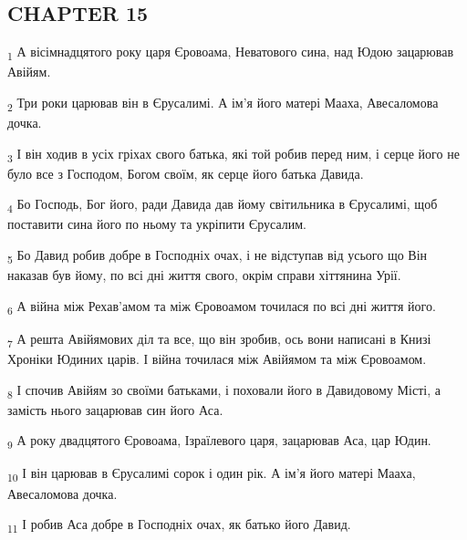 \subsection{CHAPTER 15}
\begin{tcolorbox}
\textsubscript{1} А вісімнадцятого року царя Єровоама, Неватового сина, над Юдою зацарював Авійям.
\end{tcolorbox}
\begin{tcolorbox}
\textsubscript{2} Три роки царював він в Єрусалимі. А ім'я його матері Мааха, Авесаломова дочка.
\end{tcolorbox}
\begin{tcolorbox}
\textsubscript{3} І він ходив в усіх гріхах свого батька, які той робив перед ним, і серце його не було все з Господом, Богом своїм, як серце його батька Давида.
\end{tcolorbox}
\begin{tcolorbox}
\textsubscript{4} Бо Господь, Бог його, ради Давида дав йому світильника в Єрусалимі, щоб поставити сина його по ньому та укріпити Єрусалим.
\end{tcolorbox}
\begin{tcolorbox}
\textsubscript{5} Бо Давид робив добре в Господніх очах, і не відступав від усього що Він наказав був йому, по всі дні життя свого, окрім справи хіттянина Урії.
\end{tcolorbox}
\begin{tcolorbox}
\textsubscript{6} А війна між Рехав'амом та між Єровоамом точилася по всі дні життя його.
\end{tcolorbox}
\begin{tcolorbox}
\textsubscript{7} А решта Авійямових діл та все, що він зробив, ось вони написані в Книзі Хроніки Юдиних царів. І війна точилася між Авійямом та між Єровоамом.
\end{tcolorbox}
\begin{tcolorbox}
\textsubscript{8} І спочив Авійям зо своїми батьками, і поховали його в Давидовому Місті, а замість нього зацарював син його Аса.
\end{tcolorbox}
\begin{tcolorbox}
\textsubscript{9} А року двадцятого Єровоама, Ізраїлевого царя, зацарював Аса, цар Юдин.
\end{tcolorbox}
\begin{tcolorbox}
\textsubscript{10} І він царював в Єрусалимі сорок і один рік. А ім'я його матері Мааха, Авесаломова дочка.
\end{tcolorbox}
\begin{tcolorbox}
\textsubscript{11} І робив Аса добре в Господніх очах, як батько його Давид.
\end{tcolorbox}
